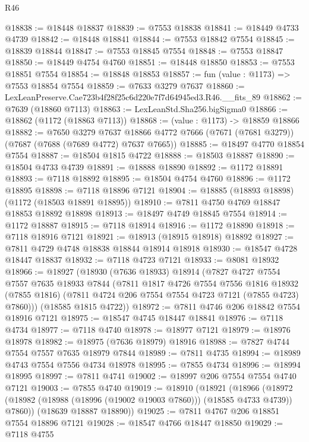 \begin{lexlean}{R46}
\begin{coremodule}
@18838 := @18448 @18837
@18839 := @7553 @18838
@18841 := @18449 @4733 @4739
@18842 := @18448 @18841
@18844 := @7553 @18842 @7554
@18845 := @18839 @18844
@18847 := @7553 @18845 @7554
@18848 := @7553 @18847
@18850 := @18449 @4754 @4760
@18851 := @18448 @18850
@18853 := @7553 @18851 @7554
@18854 := @18848 @18853
@18857 := fun (value : @1173) => @7553 @18854 @7554
@18859 := @7633 @3279 @7637
@18860 := LexLeanPreserve.Cae723b4f28f25c6d220e7f7d64945ed3.R46.__fits_89
@18862 := @7639 (@18860 @7113)
@18863 := LexLeanStd.Sha256.bigSigma0
@18866 := @18862 (@1172 (@18863 @7113))
@18868 := (value : @1173) -> @18859 @18866
@18882 := @7650
    @3279
    @7637
    @18866
    @4772
    @7666
    (@7671 (@7681 @3279))
    (@7687 (@7688 (@7689 @4772) @7637 @7665))
@18885 := @18497 @4770 @18854 @7554
@18887 := @18504 @1815 @4722
@18888 := @18503 @18887
@18890 := @18504 @4733 @4739
@18891 := @18888 @18890
@18892 := @1172 @18891
@18893 := @7118 @18892
@18895 := @18504 @4754 @4760
@18896 := @1172 @18895
@18898 := @7118 @18896 @7121
@18904 := @18885 (@18893 @18898) (@1172 (@18503 @18891 @18895))
@18910 := @7811 @4750 @4769 @18847 @18853 @18892 @18898
@18913 := @18497 @4749 @18845 @7554
@18914 := @1172 @18887
@18915 := @7118 @18914
@18916 := @1172 @18890
@18918 := @7118 @18916 @7121
@18921 := @18913 (@18915 @18918) @18892
@18927 := @7811 @4729 @4748 @18838 @18844 @18914 @18918
@18930 := @18547 @4728 @18447 @18837
@18932 := @7118 @4723 @7121
@18933 := @8081 @18932
@18966 := @18927
    (@18930
      (@7636 @18933)
      @18914
      (@7827
        @4727
        @7554
        @7557
        @7635
        @18933
        @7844
        (@7811
          @1817
          @4726
          @7554
          @7556
          @1816
          @18932
          (@7855 @1816)
          (@7811 @4724 @206 @7554 @7554 @4723 @7121 (@7855 @4723) @7860)))
      (@18585 @1815 @4722))
@18972 := @7811 @4746 @206 @18842 @7554 @18916 @7121
@18975 := @18547 @4745 @18447 @18841
@18976 := @7118 @4734
@18977 := @7118 @4740
@18978 := @18977 @7121
@18979 := @18976 @18978
@18982 := @18975 (@7636 @18979) @18916
@18988 := @7827 @4744 @7554 @7557 @7635 @18979 @7844
@18989 := @7811 @4735
@18994 := @18989 @4743 @7554 @7556 @4734 @18978
@18995 := @7855 @4734
@18996 := @18994 @18995
@18997 := @7811 @4741
@19002 := @18997 @206 @7554 @7554 @4740 @7121
@19003 := @7855 @4740
@19019 := @18910
    (@18921
      (@18966 (@18972 (@18982 (@18988 (@18996 (@19002 @19003 @7860))) (@18585 @4733 @4739)) @7860))
      (@18639 @18887 @18890))
@19025 := @7811 @4767 @206 @18851 @7554 @18896 @7121
@19028 := @18547 @4766 @18447 @18850
@19029 := @7118 @4755

\end{coremodule}
\end{lexlean}
